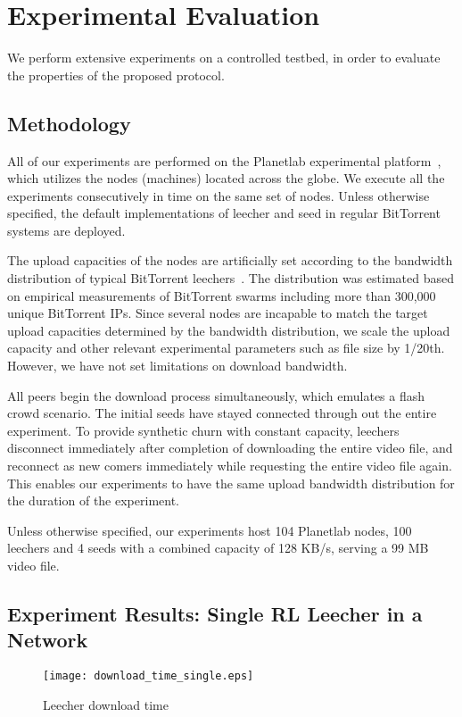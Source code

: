 \section{Experimental Evaluation}
\label{sec:evaluation}
We perform extensive experiments on a controlled testbed, in order to evaluate 
the properties of the proposed protocol. 

\subsection{Methodology}
\label{sec:methodology}
All of our experiments are performed on the Planetlab experimental 
platform~\cite{planetlab04}, which utilizes the nodes (machines) located across 
the globe.
We execute all the experiments consecutively in time on the same set of 
nodes. Unless otherwise specified, the default implementations
of leecher and seed in regular BitTorrent systems are deployed. 

The upload capacities of the nodes are artificially set according to the 
bandwidth distribution of typical BitTorrent leechers~\cite{piatek07}.
The distribution was estimated based on empirical measurements of BitTorrent 
swarms including more than 300,000 unique BitTorrent IPs.
Since several nodes are incapable to match the target upload capacities 
determined by the bandwidth distribution, 
we scale the upload capacity and other relevant experimental parameters such 
as file size by 1/20th. 
However, we have not set limitations on download bandwidth.

All peers begin the download process simultaneously, which emulates a flash 
crowd scenario. 
The initial seeds have stayed connected through out the entire experiment.
To provide synthetic churn with constant capacity, leechers disconnect 
immediately after completion of downloading the entire video file, and
reconnect as new comers immediately while requesting the entire video file 
again. This enables our experiments to have the same upload bandwidth 
distribution for the duration of the experiment.

Unless otherwise specified, our experiments host 104 Planetlab nodes, 100 
leechers and 4 seeds with a combined capacity of 128 KB/s, serving a 99 MB video 
file. 

\subsection{Experiment Results: Single RL Leecher in a Network}
\begin{figure}[t]
\centering
\texttt{[image: download\_time\_single.eps]}
\caption{Leecher download time} 
\label{fig:single}
\end{figure}

